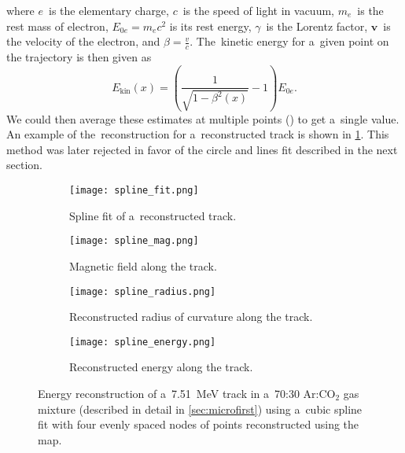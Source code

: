 		where $e$~is the elementary charge, $c$~is the speed of light in vacuum, $m_e$~is the rest mass of electron, $E_{0e} = m_e c^2$ is its rest energy, $\gamma$~is the Lorentz factor, $\bm{v}$~is the velocity of the electron, and $\beta = \frac{v}{c}$. The~kinetic energy for a~given point on the trajectory is then given as
			\begin{equation}
				\label{eq:ekin2}
				E_\text{kin}(x) = \left(\frac{1}{\sqrt{1-\beta^2(x)}}-1\right)E_{0e}.
			\end{equation}
		We could then average these estimates at multiple points () to get a~single value. An example of the~reconstruction for a~reconstructed track is shown in \cref{fig:spline}. This method was later rejected in favor of the circle and lines fit described in the next section.
		
		\begin{figure}
			\centering
			\begin{subfigure}[t]{0.48\textwidth}
				\centering
				\texttt{[image: spline\_fit.png]}
				\caption{Spline fit of a~reconstructed track.}
			\end{subfigure}
			\hfill
			\begin{subfigure}[t]{0.48\textwidth}
				\centering
				\texttt{[image: spline\_mag.png]}
				\caption{Magnetic field along the track.}
			\end{subfigure}
			\hfill
			\begin{subfigure}[t]{0.48\textwidth}
				\centering
				\texttt{[image: spline\_radius.png]}
				\caption{Reconstructed radius of curvature along the track.}
			\end{subfigure}
			\hfill
			\begin{subfigure}[t]{0.48\textwidth}
				\centering
				\texttt{[image: spline\_energy.png]}
				\caption{Reconstructed energy along the track.}
			\end{subfigure}
			\caption{Energy reconstruction of a~\qty{7.51}{\MeV} track in a~70:30 Ar:CO$_2$ gas mixture (described in detail in \cref{sec:microfirst}) using a~cubic spline fit with four evenly spaced nodes of points reconstructed using the map.}
			\label{fig:spline}
		\end{figure}
	
